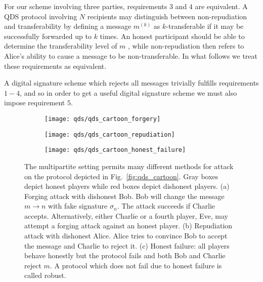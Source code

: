 For our scheme involving three parties, requirements $3$ and $4$ are equivalent. A QDS protocol involving $N$ recipients may distinguish between non-repudiation and transferability by defining a message $m^{\left(k\right)}$ as $k$-transferable if it may be successfully forwarded up to $k$ times. An honest participant should be able to determine the transferability level of $m$ \cite{Arrazola2016}, while non-repudiation then refers to Alice's ability to cause a message to be non-transferable. In what follows we treat these requirements as equivalent.

A digital signature scheme which rejects all messages trivially fulfills requirements $1-4$, and so in order to get a useful digital signature scheme we must also impose requirement $5$.

\begin{figure}[htp]
\captionsetup{width=0.8\linewidth}
\centering
	\begin{subfigure}{\linewidth}
		\centering
		\texttt{[image: qds/qds\_cartoon\_forgery]}
		\caption{\label{fig:attacks_forgery}}
	\end{subfigure}
	\begin{subfigure}{\linewidth}
		\centering
		\texttt{[image: qds/qds\_cartoon\_repudiation]}
		\caption{\label{fig:attacks_repudiation}}
	\end{subfigure}
	\begin{subfigure}{\linewidth}
		\centering
		\texttt{[image: qds/qds\_cartoon\_honest\_failure]}
		\caption{\label{fig:attacks_robustness}}
	\end{subfigure}
\caption{\label{fig:qds_attacks} The multipartite setting permits many different methods for attack on the protocol depicted in Fig.~\ref{fig:qds_cartoon}. Gray boxes depict honest players while red boxes depict dishonest players. (a) Forging attack with dishonest Bob. Bob will change the message $m \rightarrow n$ with fake signature $\sigma_n$. The attack succeeds if Charlie accepts. Alternatively, either Charlie or a fourth player, Eve, may attempt a forging attack against an honest player. (b) Repudiation attack with dishonest Alice. Alice tries to convince Bob to accept the message and Charlie to reject it. (c) Honest failure: all players behave honestly but the protocol fails and both Bob and Charlie reject $m$. A protocol which does not fail due to honest failure is called robust.}
\end{figure}

